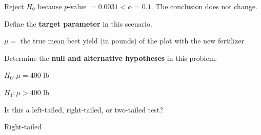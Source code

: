 \documentclass[noanswers]{exam}
\begin{document}
\begin{questions}
\begin{solution}[\stretch{1}]
\vspace{3mm}

Reject $H_0$ because $p$-value $=0.0031<\alpha=0.1$. The conclusion does not change.

\vspace{3mm}

\end{solution} 


\newpage


\vspace{4mm}

\question Define the \textbf{target parameter} in this scenario.

\begin{solution}[\stretch{1}]

\vspace{1mm}

$\mu=$ the true mean beet yield (in pounds) of the plot with the new fertilizer

\vspace{1mm}

\end{solution}

\question Determine the \textbf{null and alternative hypotheses} in this problem.

\begin{solution}[\stretch{1}]

\vspace{1mm}

$H_0:\mu=400$ lb

$H_1:\mu>400$ lb

\vspace{1mm}

\end{solution}

\question Is this a left-tailed, right-tailed, or two-tailed test?

\begin{solution}[\stretch{1}]

\vspace{1mm}

Right-tailed

\vspace{1mm}


\end{solution}
\end{questions}
\end{document}
